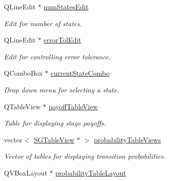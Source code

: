 \begin{DoxyCompactItemize}
Q\+Line\+Edit $\ast$ \hyperlink{classSGGameHandler_afb806d54a9d193c5ab8e3a1510001fba}{num\+States\+Edit}
\begin{DoxyCompactList}\small\item\em Edit for number of states. \end{DoxyCompactList}\item 
\mbox{\label{classSGGameHandler_aec404b883f476d06e7d19dd3a1ea7336}} 
Q\+Line\+Edit $\ast$ \hyperlink{classSGGameHandler_aec404b883f476d06e7d19dd3a1ea7336}{error\+Tol\+Edit}
\begin{DoxyCompactList}\small\item\em Edit for controlling error tolerance. \end{DoxyCompactList}\item 
\mbox{\label{classSGGameHandler_af722a69ea2f4a6a5c56171a2126aac5c}} 
Q\+Combo\+Box $\ast$ \hyperlink{classSGGameHandler_af722a69ea2f4a6a5c56171a2126aac5c}{current\+State\+Combo}
\begin{DoxyCompactList}\small\item\em Drop down menu for selecting a state. \end{DoxyCompactList}\item 
\mbox{\label{classSGGameHandler_a5c40be01364eb863bc087776648be235}} 
Q\+Table\+View $\ast$ \hyperlink{classSGGameHandler_a5c40be01364eb863bc087776648be235}{payoff\+Table\+View}
\begin{DoxyCompactList}\small\item\em Table for displaying stage payoffs. \end{DoxyCompactList}\item 
\mbox{\label{classSGGameHandler_a2e6f4e94869b83d54badeb5c5f1f8e64}} 
vector$<$ \hyperlink{classSGTableView}{S\+G\+Table\+View} $\ast$ $>$ \hyperlink{classSGGameHandler_a2e6f4e94869b83d54badeb5c5f1f8e64}{probability\+Table\+Views}
\begin{DoxyCompactList}\small\item\em Vector of tables for displaying transition probabilities. \end{DoxyCompactList}\item 
\mbox{\label{classSGGameHandler_a4c3c643906ccdf6283666007c4f8a49e}} 
Q\+V\+Box\+Layout $\ast$ \hyperlink{classSGGameHandler_a4c3c643906ccdf6283666007c4f8a49e}{probability\+Table\+Layout}

\end{DoxyCompactItemize}
